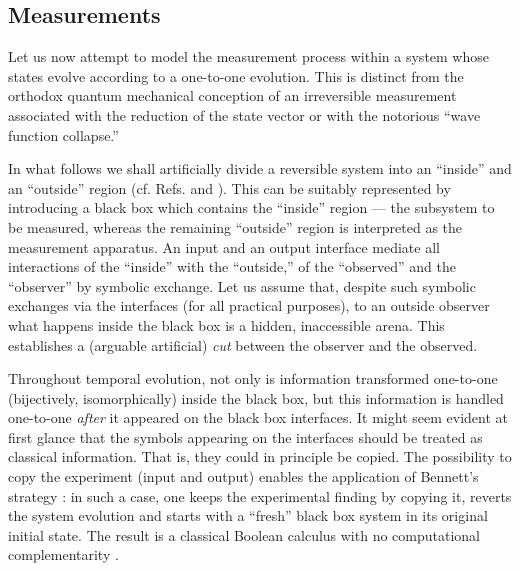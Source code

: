 




\subsection*{Measurements}
Let us now attempt  to  model the
measurement
process within a system whose states evolve according  to a one-to-one
evolution. This is distinct from the orthodox quantum
mechanical
conception of an irreversible measurement associated with the reduction
of the state vector or with the notorious ``wave function collapse.''


In what follows we shall artificially divide a reversible system into an
``inside'' and an
``outside'' region
(cf. Refs.
\cite{bos,toffoli:79,svo-83,svo5,svo-86,roessler-87,roessler-92,weibel:92}
and
\cite[chapter 6]{svozil-93}).
This can be suitably represented by introducing a black box which
contains the ``inside'' region
--- the subsystem to be measured, whereas
the
remaining ``outside'' region is interpreted as the measurement
apparatus.
An input and an output interface mediate all interactions of the
``inside'' with the ``outside,'' of the ``observed'' and the
``observer'' by symbolic exchange. Let us assume that, despite such
symbolic exchanges via the interfaces
(for all practical purposes),
to an outside
observer
 what happens inside the black box is a hidden,
 inaccessible
  arena. This establishes a (arguable artificial) {\em cut} between the
observer and the observed.


Throughout temporal evolution, not only is information transformed
one-to-one
(bijectively, isomorphically) inside the black box,
but
this information is handled  one-to-one {\em after} it appeared on the
black box
interfaces. It might  seem evident at first glance that the symbols
appearing on the interfaces should be treated as classical information.
That is, they could in principle be copied. The possibility to copy the
experiment (input and output) enables the application of Bennett's
strategy
\cite{bennett-73}:
in such a case, one keeps the experimental finding by copying
it, reverts the system evolution and starts with a ``fresh'' black
box system in its original initial state. The result is a
classical Boolean calculus with no computational complementarity
\cite{ca-ca-st}.

